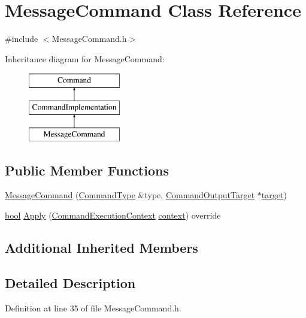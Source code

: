 \hypertarget{class_message_command}{}\section{Message\+Command Class Reference}
\label{class_message_command}


{\ttfamily \#include $<$Message\+Command.\+h$>$}

Inheritance diagram for Message\+Command\+:\begin{figure}[H]
\begin{center}
\leavevmode
\includegraphics[height=3.000000cm]{class_message_command}
\end{center}
\end{figure}
\subsection*{Public Member Functions}
\begin{DoxyCompactItemize}
\item 
\hyperlink{class_message_command_a5f35a99108868c7b29bf6f8e77cb7411}{Message\+Command} (\hyperlink{class_command_type}{Command\+Type} \&type, \hyperlink{class_command_output_target}{Command\+Output\+Target} $\ast$\hyperlink{lib_2expat_8h_a15a257516a87decb971420e718853137}{target})
\item 
\hyperlink{mac_2config_2i386_2lib-src_2libsoxr_2soxr-config_8h_abb452686968e48b67397da5f97445f5b}{bool} \hyperlink{class_message_command_a7076dcef5844ca1b354bd1d4c517c252}{Apply} (\hyperlink{class_command_execution_context}{Command\+Execution\+Context} \hyperlink{structcontext}{context}) override
\end{DoxyCompactItemize}
\subsection*{Additional Inherited Members}


\subsection{Detailed Description}


Definition at line 35 of file Message\+Command.\+h.



